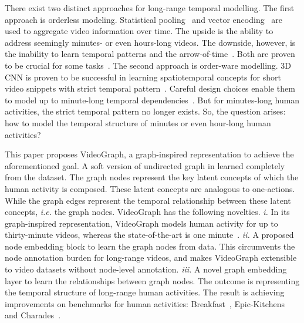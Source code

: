 \documentclass[10pt,twocolumn,letterpaper]{article}
\begin{document}
There exist two distinct approaches for long-range temporal modelling. The first approach is orderless modeling.
Statistical pooling~\cite{hussein2017unified} and vector encoding~\cite{duta2017spatio, girdhar2017actionvlad} are used to aggregate video information over time.
The upside is the ability to address seemingly minutes- or even hours-long videos.
The downside, however, is the inability to learn temporal patterns and the arrow-of-time~\cite{ghodrati2018video}.
Both are proven to be crucial for some tasks~\cite{sigurdsson2017actions, huang2018makes}.
The second approach is order-ware modelling. 3D CNN is proven to be successful in learning spatiotemporal concepts for short video snippets with strict temporal pattern~\cite{carreira2017quo}.
Careful design choices enable them to model up to minute-long temporal dependencies~\cite{hussein2018timeception}.
But for minutes-long human activities, the strict temporal pattern no longer exists.
So, the question arises: how to model the temporal structure of minutes or even hour-long human activities?

This paper proposes VideoGraph, a graph-inspired representation to achieve the aforementioned goal.
A soft version of undirected graph in learned completely from the dataset.
The graph nodes represent the key latent concepts of which the human activity is composed.
These latent concepts are analogous to one-actions.
While the graph edges represent the temporal relationship between these latent concepts, \emph{i.e.} the graph nodes.
VideoGraph has the following novelties.
\textit{i.} In its graph-inspired representation, VideoGraph models human activity for up to thirty-minute videos, whereas the state-of-the-art is one minute~\cite{hussein2018timeception}.
\textit{ii.} A proposed node embedding block to learn the graph nodes from data.
This circumvents the node annotation burden for long-range videos, and makes VideoGraph extensible to video datasets without node-level annotation.
\textit{iii.} A novel graph embedding layer to learn the relationships between graph nodes.
The outcome is representing the temporal structure of long-range human activities.
The result is achieving improvements on benchmarks for human activities: Breakfast~\cite{kuehne2014language}, Epic-Kitchens~\cite{damen2018scaling} and Charades~\cite{sigurdsson2016hollywood}.
\end{document}
